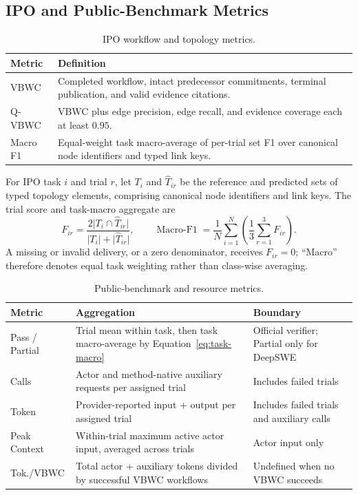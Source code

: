 \subsection{IPO and Public-Benchmark Metrics}
\begin{table}[H]
\centering
\normalsize
\renewcommand{\arraystretch}{1.14}
\caption{IPO workflow and topology metrics.}
\begin{tabularx}{0.94\textwidth}{@{}p{} X@{}}
\toprule
\textbf{Metric} & \textbf{Definition} \\
\midrule
VBWC & Completed workflow, intact predecessor commitments, terminal publication, and valid evidence citations. \\
Q-VBWC & VBWC plus edge precision, edge recall, and evidence coverage each at least $0.95$. \\
Macro F1 & Equal-weight task macro-average of per-trial set F1 over canonical node identifiers and typed link keys. \\
\bottomrule
\end{tabularx}
\end{table}
For IPO task $i$ and trial $r$, let $T_i$ and $\widehat T_{ir}$ be the reference and predicted sets of typed topology elements, comprising canonical node identifiers and link keys. The trial score and task-macro aggregate are
\begin{equation}
F_{ir}=\frac{2\lvert T_i\cap\widehat T_{ir}\rvert}{\lvert T_i\rvert+\lvert\widehat T_{ir}\rvert},
\qquad
\operatorname{Macro\text{-}F1}=\frac{1}{N}\sum_{i=1}^{N}\left(\frac{1}{3}\sum_{r=1}^{3}F_{ir}\right).
\label{eq:ipo-macro-f1}
\end{equation}
A missing or invalid delivery, or a zero denominator, receives $F_{ir}=0$; ``Macro'' therefore denotes equal task weighting rather than class-wise averaging.
\begin{table}[H]
\centering
\normalsize
\renewcommand{\arraystretch}{1.14}
\caption{Public-benchmark and resource metrics.}
\begin{tabularx}{0.95\textwidth}{@{}p{} X X@{}}
\toprule
\textbf{Metric} & \textbf{Aggregation} & \textbf{Boundary} \\
\midrule
Pass / Partial & Trial mean within task, then task macro-average by Equation~\eqref{eq:task-macro} & Official verifier; Partial only for DeepSWE \\
Calls & Actor and method-native auxiliary requests per assigned trial & Includes failed trials \\
Token & Provider-reported input + output per assigned trial & Includes failed trials and auxiliary calls \\
Peak Context & Within-trial maximum active actor input, averaged across trials & Actor input only \\
Tok./VBWC & Total actor + auxiliary tokens divided by successful VBWC workflows & Undefined when no VBWC succeeds \\
\bottomrule
\end{tabularx}
\end{table}
